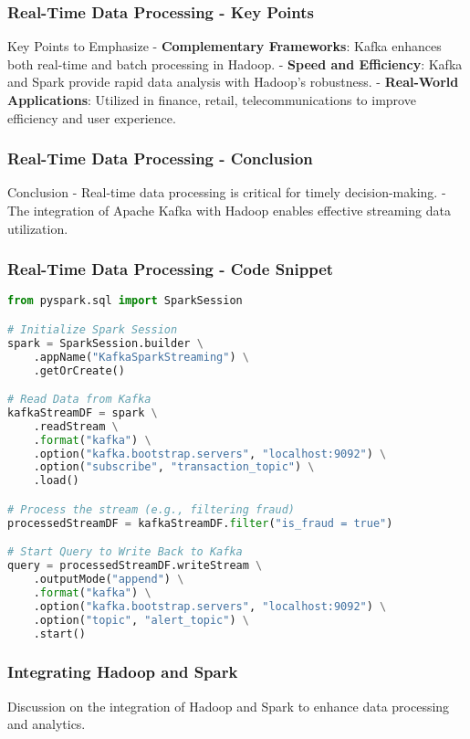 \documentclass[aspectratio=169]{beamer}
\begin{document}
\begin{frame}[fragile]
    \frametitle{Real-Time Data Processing - Key Points}
    \begin{block}{Key Points to Emphasize}
        - \textbf{Complementary Frameworks}: Kafka enhances both real-time and batch processing in Hadoop.
        - \textbf{Speed and Efficiency}: Kafka and Spark provide rapid data analysis with Hadoop's robustness.
        - \textbf{Real-World Applications}: Utilized in finance, retail, telecommunications to improve efficiency and user experience.
    \end{block}
\end{frame}

\begin{frame}[fragile]
    \frametitle{Real-Time Data Processing - Conclusion}
    \begin{block}{Conclusion}
        - Real-time data processing is critical for timely decision-making.
        - The integration of Apache Kafka with Hadoop enables effective streaming data utilization.
    \end{block}
\end{frame}

\begin{frame}[fragile]
    \frametitle{Real-Time Data Processing - Code Snippet}
    \begin{lstlisting}[language=Python]
from pyspark.sql import SparkSession

# Initialize Spark Session
spark = SparkSession.builder \
    .appName("KafkaSparkStreaming") \
    .getOrCreate()

# Read Data from Kafka
kafkaStreamDF = spark \
    .readStream \
    .format("kafka") \
    .option("kafka.bootstrap.servers", "localhost:9092") \
    .option("subscribe", "transaction_topic") \
    .load()

# Process the stream (e.g., filtering fraud)
processedStreamDF = kafkaStreamDF.filter("is_fraud = true")

# Start Query to Write Back to Kafka
query = processedStreamDF.writeStream \
    .outputMode("append") \
    .format("kafka") \
    .option("kafka.bootstrap.servers", "localhost:9092") \
    .option("topic", "alert_topic") \
    .start()
    \end{lstlisting}
\end{frame}

\begin{frame}
    \frametitle{Integrating Hadoop and Spark}
    Discussion on the integration of Hadoop and Spark to enhance data processing and analytics.
\end{frame}
\end{document}
